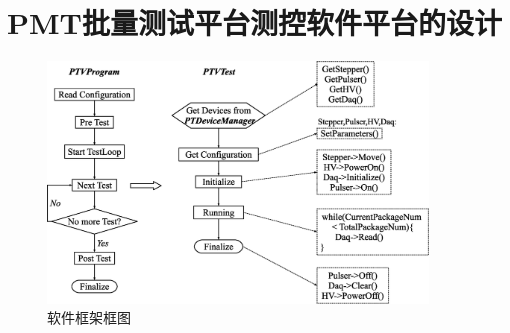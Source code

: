 
\chapter{PMT批量测试平台测控软件平台的设计}
\label{appendix:pmttest_software}

\begin{figure}[htbp]
	\centering
	\includegraphics[width=0.9\textwidth]{chap/pmt_test/fig/software_framework.eps}
	\caption{软件框架框图}
	\label{fig:pmt_test:software_framework}
\end{figure}